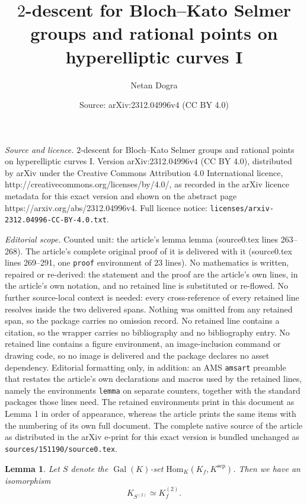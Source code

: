 \documentclass[10pt,a4paper]{amsart}
\title{$2$-descent for Bloch--Kato Selmer groups and rational points on hyperelliptic curves I}
\author{Netan Dogra}
\date{Source: arXiv:2312.04996v4 (CC BY 4.0)}
\newtheorem{lemma}{Lemma}
\DeclareMathOperator{\Gal}{Gal}
\newcommand{\Hom}{\mathrm{Hom}}
\newcommand{\sep}{\mathrm{sep}}
\begin{document}
\maketitle

\noindent\emph{Source and licence.} $2$-descent for Bloch--Kato Selmer groups and rational points on hyperelliptic curves I. Version arXiv:2312.04996v4 (CC BY 4.0), distributed by arXiv under the Creative Commons Attribution 4.0 International licence, http://creativecommons.org/licenses/by/4.0/, as recorded in the arXiv licence metadata for this exact version and shown on the abstract page https://arxiv.org/abs/2312.04996v4. Full licence notice: \texttt{licenses/arxiv-2312.04996-CC-BY-4.0.txt}.\par\smallskip

\noindent\textit{Editorial scope.} Counted unit: the article's lemma lemma (source0.tex lines 263--268). The article's complete original proof of it is delivered with it (source0.tex lines 269--291, one \texttt{proof} environment of 23 lines). No mathematics is written, repaired or re-derived: the statement and the proof are the article's own lines, in the article's own notation, and no retained line is substituted or re-flowed.  No further source-local context is needed: every cross-reference of every retained line resolves inside the two delivered spans.  Nothing was omitted from any retained span, so the package carries no omission record.  No retained line contains a citation, so the wrapper carries no bibliography and no bibliography entry.  No retained line contains a figure environment, an image-inclusion command or drawing code, so no image is delivered and the package declares no asset dependency.  Editorial formatting only, in addition: an AMS \texttt{amsart} preamble that restates the article's own declarations and macros used by the retained lines, namely the environments \texttt{lemma} on separate counters, together with the standard packages those lines need.  The retained environments print in this document as Lemma 1 in order of appearance, whereas the article prints the same items with the numbering of its own full document.  The complete native source of the article as distributed in the arXiv e-print for this exact version is bundled unchanged as \texttt{sources/151190/source0.tex}.
\begin{lemma}
Let $S$ denote the $\Gal (K)$-set $\Hom _K (K_f ,K^{\sep })$. Then we have an isomorphism
\[
K_{S^{(2)}}\simeq K_f ^{(2)}.
\]
\end{lemma}
\end{document}
